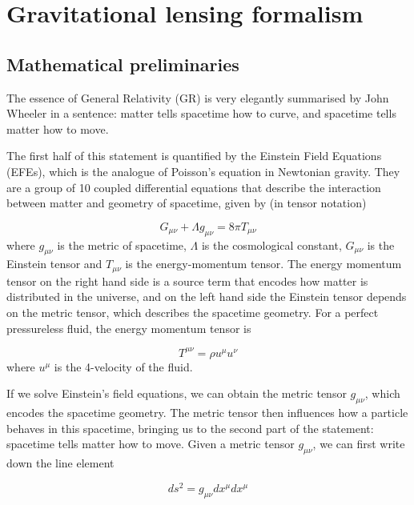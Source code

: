 \chapter{Gravitational lensing formalism}
\label{chapter:gravitational-lensing-formalism}

\section{Mathematical preliminaries}

The essence of General Relativity (GR) is very elegantly summarised by John Wheeler \citep[pg.235]{wheeler2000geons} in a sentence: matter tells spacetime how to curve, and spacetime tells matter how to move. 

The first half of this statement is quantified by the Einstein Field Equations (EFEs), which is the analogue of Poisson's equation in Newtonian gravity. They are a group of 10 coupled differential equations that describe the interaction between matter and geometry of spacetime, given by (in tensor notation)

\begin{equation}
  G_{\mu \nu} + \Lambda g_{\mu \nu} = 8\pi T_{\mu \nu}
  \label{eq:efes}
\end{equation}
where $g_{\mu \nu}$ is the metric of spacetime, $\Lambda$ is the cosmological constant, $G_{\mu \nu}$ is the Einstein tensor and $T_{\mu \nu}$ is the energy-momentum tensor. The energy momentum tensor on the right hand side is a source term that encodes how matter is distributed in the universe, and on the left hand side the Einstein tensor depends on the metric tensor, which describes the spacetime geometry. For a perfect pressureless fluid, the energy momentum tensor is

\begin{equation}
  T^{\mu \nu} = \rho u^{\mu} u^{\nu}
\end{equation}
where $u^{\mu}$ is the 4-velocity of the fluid. 

If we solve Einstein's field equations, we can obtain the metric tensor $g_{\mu \nu}$, which encodes the spacetime geometry. The metric tensor then influences how a particle behaves in this spacetime, bringing us to the second part of the statement: spacetime tells matter how to move. Given a metric tensor $g_{\mu \nu}$, we can first write down the line element

\begin{equation}
  ds^2 = g_{\mu \nu} dx^{\mu} dx^{\mu}
  \label{eq:line-element}
\end{equation}

